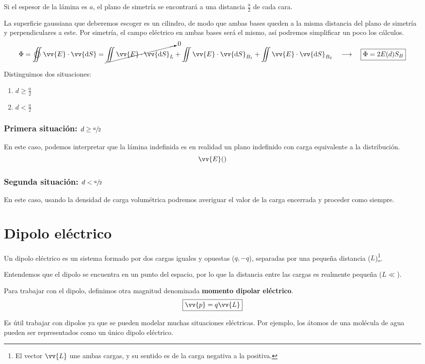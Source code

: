 \documentclass[a4paper]{book}
\numberwithin{figure}{chapter}
\numberwithin{equation}{chapter}
\renewcommand{\vec}[1]{\vv{{#1}}}
\begin{document}
Si el espesor de la lámina es $a$, el plano de simetría se encontrará a una distancia $\frac{a}{2}$ de cada cara.

La superficie gaussiana que deberemos escoger es un cilindro, de modo que ambas bases queden a la misma distancia del plano de simetría y perpendiculares a este. Por simetría, el campo eléctrico en ambas bases será el mismo, así podremos simplificar un poco los cálculos.
\[\Phi = \varoiint \vec{E}\cdot \vec{\dd S} = \cancelto{0}{\iint \vec{E}\cdot \vec{\dd S}_L} + \iint \vec{E}\cdot \vec{\dd S}_{B_1} + \iint \vec{E}\cdot \vec{\dd S}_{B_2} \quad \longrightarrow \quad \boxed{\Phi = 2E(d) S_B}\]

Distinguimos dos situaciones:
\begin{enumerate}
	\item $d\geq \frac{a}{2}$
	\item $d<\frac{a}{2}$
\end{enumerate}

\subsubsection{Primera situación: $d\geq \sfrac{a}{2}$}
En este caso, podemos interpretar que la lámina indefinida es en realidad un plano indefinido con carga equivalente a la distribución.
\[\vec{E}()\]
\subsubsection{Segunda situación: $d<\sfrac{a}{2}$}
En este caso, usando la densidad de carga volumétrica podremos averiguar el valor de la carga encerrada y proceder como siempre.

\section{Dipolo eléctrico}
Un dipolo eléctrico es un sistema formado por dos cargas iguales y opuestas ($q,-q$), separadas por una pequeña distancia ($L$)\footnote{El vector $\vec{L}$ une ambas cargas, y su sentido es de la carga negativa a la positiva.}.

Entendemos que el dipolo se encuentra en un punto del espacio, por lo que la distancia entre las cargas es realmente pequeña ($L\ll $).

Para trabajar con el dipolo, definimos otra magnitud denominada \textbf{momento dipolar eléctrico}.
\[\boxed{\vec{p}=q\vec{L}}\]

Es útil trabajar con dipolos ya que se pueden modelar muchas situaciones eléctricas. Por ejemplo, los átomos de una molécula de agua pueden ser representados como un único dipolo eléctrico.
\end{document}
